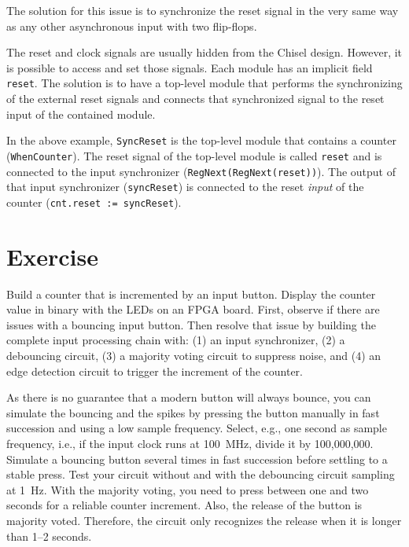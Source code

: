 \documentclass[%
    10pt,
    headinclude, footexclude,
    openright, %
    notitlepage,
    cleardoubleempty,
    headsepline,
    pointlessnumbers,
    bibtotoc, idxtotoc,
    ]{scrbook}
\newcommand{\code}[1]{{\lstinline[basicstyle=\small\ttfamily]{#1}}}
\begin{document}
The solution for this issue is to synchronize the reset signal in the very same way as
any other asynchronous input with two flip-flops.

The reset and clock signals are usually hidden from the Chisel design.
However, it is possible to access and set those signals. Each module has an implicit field
\code{reset}. The solution is to have a top-level module that performs the synchronizing
of the external reset signals and connects that synchronized signal to the reset input
of the contained module.


In the above example, \code{SyncReset} is the top-level module that contains a
counter (\code{WhenCounter}). The reset signal of the top-level module is called
\code{reset} and is connected to the input synchronizer (\code{RegNext(RegNext(reset))}).
The output of that input synchronizer (\code{syncReset}) is connected to the reset \emph{input}
of the counter (\code{cnt.reset := syncReset}).


\section{Exercise}

Build a counter that is incremented by an input button.
Display the counter value in binary with the LEDs on an FPGA board.
First, observe if there are issues with a bouncing input button.
Then resolve that issue by building
the complete input processing chain with: (1) an input synchronizer,
(2) a debouncing circuit, (3) a majority voting circuit to suppress noise,
and (4) an edge detection circuit to trigger the increment of the counter.

As there is no guarantee that a modern button will always bounce, you can
simulate the bouncing and the spikes by pressing the button manually in fast succession
and using a low sample frequency. Select, e.g., one second as sample frequency,
i.e., if the input clock runs at 100~MHz, divide it by 100,000,000.
Simulate a bouncing button several times in fast succession
before settling to a stable press. Test your circuit without and with the
debouncing circuit sampling at 1~Hz.
With the majority voting, you need to press between one and two seconds
for a reliable counter increment. Also, the release of the button is
majority voted. Therefore, the circuit only recognizes the release when it is
longer than 1--2 seconds.
\end{document}
